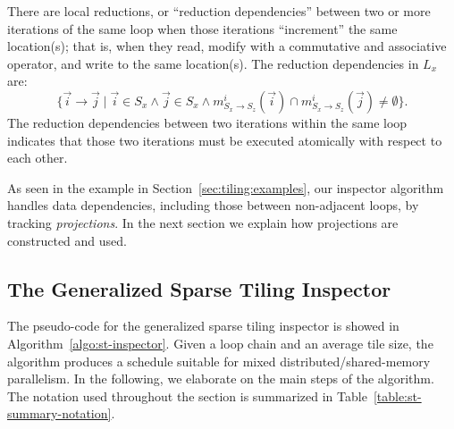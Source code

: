 There are local reductions, or ``reduction dependencies'' between two or more iterations of the same loop when those iterations ``increment'' the same location(s); that is, when they read, modify with a commutative and associative operator, and write to the same location(s). The reduction dependencies in $L_x$ are:
\[
	\{ \vec{i} \rightarrow \vec{j} \; | \; \vec{i} \in S_x \wedge \vec{j} \in S_x \wedge m_{S_x\rightarrow S_z}^{i}(\vec{i}) \cap m_{S_x \rightarrow S_z}^{i}(\vec{j}) \ne \emptyset \}.
\]
The reduction dependencies between two iterations within the same loop indicates that those two iterations must be executed atomically with respect to each other.

As seen in the example in Section~\ref{sec:tiling:examples}, our inspector algorithm handles data dependencies, including those between non-adjacent loops, by tracking \textit{projections}. In the next section we explain how projections are constructed and used.



\subsection{The Generalized Sparse Tiling Inspector}
\label{sec:tiling:inspector}

The pseudo-code for the generalized sparse tiling inspector is showed in Algorithm~\ref{algo:st-inspector}. Given a loop chain and an average tile size, the algorithm produces a schedule suitable for mixed distributed/shared-memory parallelism. In the following, we elaborate on the main steps of the algorithm. The notation used throughout the section is summarized in Table~\ref{table:st-summary-notation}.

